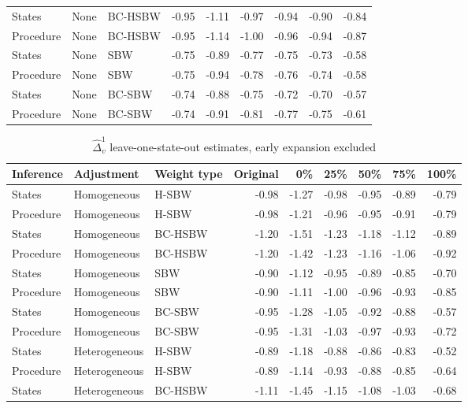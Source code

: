 \begin{table}[ht]
\begin{tabular}{lllrrrrrr}
  States & None & BC-HSBW & -0.95 & -1.11 & -0.97 & -0.94 & -0.90 & -0.84 \\ 
  Procedure & None & BC-HSBW & -0.95 & -1.14 & -1.00 & -0.96 & -0.94 & -0.87 \\ 
  States & None & SBW & -0.75 & -0.89 & -0.77 & -0.75 & -0.73 & -0.58 \\ 
  Procedure & None & SBW & -0.75 & -0.94 & -0.78 & -0.76 & -0.74 & -0.58 \\ 
  States & None & BC-SBW & -0.74 & -0.88 & -0.75 & -0.72 & -0.70 & -0.57 \\ 
  Procedure & None & BC-SBW & -0.74 & -0.91 & -0.81 & -0.77 & -0.75 & -0.61 \\ 
   \hline
\end{tabular}
\end{table}

\begin{table}[ht]
\label{tab:rdiffc2}
\caption{$\hat{\Delta}^1_v$ leave-one-state-out estimates, early expansion excluded}
\centering
\begin{tabular}{lllrrrrrr}
  \hline
Inference & Adjustment & Weight type & Original & 0\% & 25\% & 50\% & 75\% & 100\% \\ 
  \hline
States & Homogeneous & H-SBW & -0.98 & -1.27 & -0.98 & -0.95 & -0.89 & -0.79 \\ 
  Procedure & Homogeneous & H-SBW & -0.98 & -1.21 & -0.96 & -0.95 & -0.91 & -0.79 \\ 
  States & Homogeneous & BC-HSBW & -1.20 & -1.51 & -1.23 & -1.18 & -1.12 & -0.89 \\ 
  Procedure & Homogeneous & BC-HSBW & -1.20 & -1.42 & -1.23 & -1.16 & -1.06 & -0.92 \\ 
  States & Homogeneous & SBW & -0.90 & -1.12 & -0.95 & -0.89 & -0.85 & -0.70 \\ 
  Procedure & Homogeneous & SBW & -0.90 & -1.11 & -1.00 & -0.96 & -0.93 & -0.85 \\ 
  States & Homogeneous & BC-SBW & -0.95 & -1.28 & -1.05 & -0.92 & -0.88 & -0.57 \\ 
  Procedure & Homogeneous & BC-SBW & -0.95 & -1.31 & -1.03 & -0.97 & -0.93 & -0.72 \\ 
  States & Heterogeneous & H-SBW & -0.89 & -1.18 & -0.88 & -0.86 & -0.83 & -0.52 \\ 
  Procedure & Heterogeneous & H-SBW & -0.89 & -1.14 & -0.93 & -0.88 & -0.85 & -0.64 \\ 
  States & Heterogeneous & BC-HSBW & -1.11 & -1.45 & -1.15 & -1.08 & -1.03 & -0.68 \\ 

\end{tabular}
\end{table}
